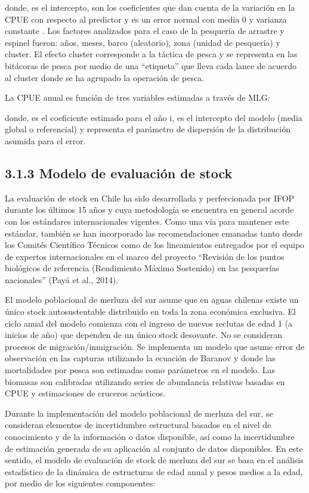 \documentclass[
  spanish,
]{article}
\begin{document}
donde, es el intercepto, son los coeficientes que dan cuenta de la
variación en la CPUE con respecto al predictor y es un error normal con
media 0 y varianza constante . Los factores analizados para el caso de
la pesquería de arrastre y espinel fueron: años, meses, barco
(aleatorio), zona (unidad de pesquería) y cluster. El efecto cluster
corresponde a la táctica de pesca y se representa en las bitácoras de
pesca por medio de una ``etiqueta'' que lleva cada lance de acuerdo al
cluster donde se ha agrupado la operación de pesca.

La CPUE anual es función de tres variables estimadas a través de MLG:

donde, es el coeficiente estimado para el año i, es el intercepto del
modelo (media global o referencial) y representa el parámetro de
dispersión de la distribución asumida para el error.

\hypertarget{modelo-de-evaluaciuxf3n-de-stock}{%
\subsection{3.1.3 Modelo de evaluación de
stock}\label{modelo-de-evaluaciuxf3n-de-stock}}

La evaluación de stock en Chile ha sido desarrollada y perfeccionada por
IFOP durante los últimos 15 años y cuya metodología se encuentra en
general acorde con los estándares internacionales vigentes. Como una vía
para mantener este estándar, también se han incorporado las
recomendaciones emanadas tanto desde los Comités Científico Técnicos
como de los lineamientos entregados por el equipo de expertos
internacionales en el marco del proyecto ``Revisión de los puntos
biológicos de referencia (Rendimiento Máximo Sostenido) en las
pesquerías nacionales'' (Payá et al., 2014).

El modelo poblacional de merluza del sur asume que en aguas chilenas
existe un único stock autosustentable distribuido en toda la zona
económica exclusiva. El ciclo anual del modelo comienza con el ingreso
de nuevos reclutas de edad 1 (a inicios de año) que dependen de un único
stock desovante. No se consideran procesos de migración/inmigración. Se
implementa un modelo que asume error de observación en las capturas
utilizando la ecuación de Baranov y donde las mortalidades por pesca son
estimadas como parámetros en el modelo. Las biomasas son calibradas
utilizando series de abundancia relativas basadas en CPUE y estimaciones
de cruceros acústicos.

Durante la implementación del modelo poblacional de merluza del sur, se
consideran elementos de incertidumbre estructural basados en el nivel de
conocimiento y de la información o datos disponible, así como la
incertidumbre de estimación generada de su aplicación al conjunto de
datos disponibles. En este sentido, el modelo de evaluación de stock de
merluza del sur se basa en el análisis estadístico de la dinámica de
estructuras de edad anual y pesos medios a la edad, por medio de los
siguientes componentes:
\end{document}
